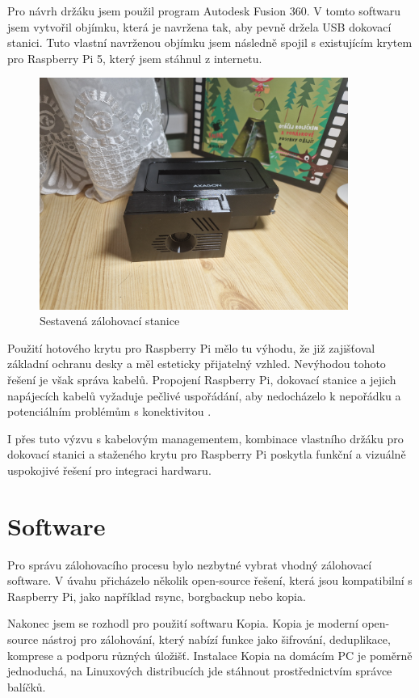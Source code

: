 \documentclass[a4paper,12pt, oneside]{book}
\begin{document}
Pro návrh držáku jsem použil program Autodesk Fusion 360. V tomto softwaru jsem
vytvořil objímku, která je navržena tak, aby pevně držela USB dokovací stanici.
Tuto vlastní navrženou objímku jsem následně spojil s existujícím krytem pro
Raspberry Pi 5, který jsem stáhnul z internetu. 

\begin{figure}[h]
\caption{Sestavená zálohovací stanice}
\centering
\includegraphics[width=0.9\textwidth]{img/skladani4.jpg}
\end{figure}

Použití hotového krytu pro Raspberry Pi mělo tu výhodu, že již zajišťoval
základní ochranu desky a měl esteticky přijatelný vzhled. Nevýhodou tohoto
řešení je však správa kabelů. Propojení Raspberry Pi, dokovací stanice a jejich
napájecích kabelů vyžaduje pečlivé uspořádání, aby nedocházelo k nepořádku a
potenciálním problémům s konektivitou . 

I přes tuto výzvu s kabelovým managementem, kombinace vlastního
držáku pro dokovací stanici a staženého krytu pro Raspberry Pi poskytla funkční
a vizuálně uspokojivé řešení pro integraci hardwaru.


\chapter{Software}

Pro správu zálohovacího procesu bylo nezbytné vybrat vhodný zálohovací software.
V úvahu přicházelo několik open-source řešení, která jsou kompatibilní s
Raspberry Pi, jako například rsync, borgbackup nebo kopia.

Nakonec jsem se rozhodl pro použití softwaru Kopia. Kopia je moderní open-source
nástroj pro zálohování, který nabízí funkce jako šifrování, deduplikace,
komprese a podporu různých úložišť. Instalace Kopia na domácím PC je poměrně jednoduchá, na Linuxových 
distribucích jde stáhnout prostřednictvím správce balíčků.
\end{document}
